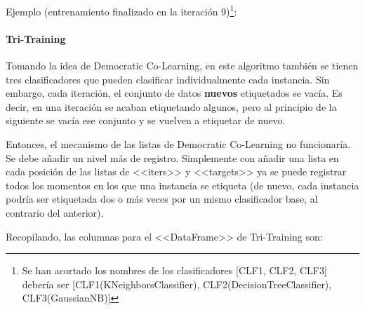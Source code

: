 Ejemplo (entrenamiento finalizado en la iteración 9)\footnote{Se han acortado los nombres de los clasificadores [CLF1, CLF2, CLF3]
debería ser [CLF1(KNeighborsClassifier), CLF2(DecisionTreeClassifier),
CLF3(GaussianNB)]}:
\begin{table}[H]
    \caption{Ejemplo de DataFrame de Democratic Co-Learning}
\end{table}


\paragraph{Tri-Training}
Tomando la idea de Democratic Co-Learning, en este algoritmo también se tienen
tres clasificadores que pueden clasificar individualmente cada instancia. Sin
embargo, cada iteración, el conjunto de datos \textbf{nuevos} etiquetados se
vacía. Es decir, en una iteración se acaban etiquetando algunos, pero al
principio de la siguiente se vacía ese conjunto y se vuelven a etiquetar de
nuevo.

Entonces, el mecanismo de las listas de Democratic Co-Learning no funcionaría.
Se debe añadir un nivel más de registro. Simplemente con añadir una lista en
cada posición de las listas de <<iters>> y <<targets>> ya se puede registrar
todos los momentos en los que una instancia se etiqueta (de nuevo, cada
instancia podría ser etiquetada dos o más veces por un mismo clasificador base,
al contrario del anterior).


Recopilando, las columnas para el <<DataFrame>> de Tri-Training son:

